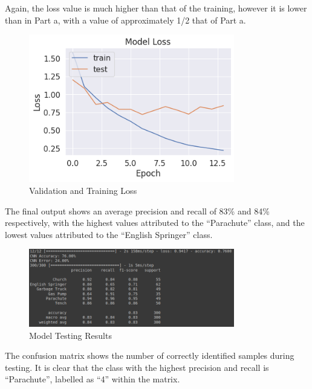 Again, the loss value is much higher than that of the training, however it is
lower than in Part a, with a value of approximately 1/2 that of Part a.

\begin{figure}[H]
	\centering
	\includegraphics[width=0.8\textwidth]{images/q1/pb/loss}
	\caption{Validation and Training Loss}
	\label{fig:q1pbloss}
\end{figure}

The final output shows an average precision and recall of 83\% and 84\%
respectively, with the highest
values attributed to the ``Parachute'' class, and the lowest values attributed
to the ``English Springer'' class.

\begin{figure}[H]
	\centering
	\includegraphics[width=0.8\textwidth]{images/q1/pb/results}
	\caption{Model Testing Results}
	\label{fig:q1pbResults}
\end{figure}

The confusion matrix shows the number of correctly identified samples during
testing. It is clear that the class with the highest precision and recall is
``Parachute'', labelled as ``4'' within the matrix.


